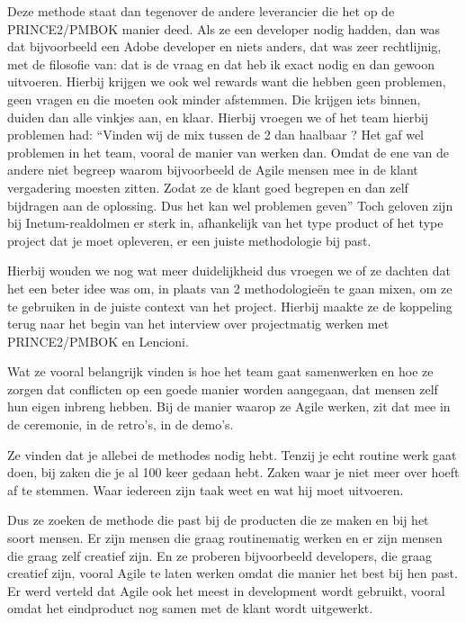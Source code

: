 \documentclass[dutch]{hogent-article}
\begin{document}
Deze methode staat dan tegenover de andere leverancier die het op de PRINCE2/PMBOK manier deed. Als ze een developer nodig hadden, dan was dat bijvoorbeeld een Adobe developer en niets anders, dat was zeer rechtlijnig, met de filosofie van: dat is de vraag en dat heb ik exact nodig en dan gewoon uitvoeren. Hierbij krijgen we ook wel rewards want die hebben geen problemen, geen vragen en die moeten ook minder afstemmen. Die krijgen iets binnen, duiden dan alle vinkjes aan, en klaar. Hierbij vroegen we of het team hierbij problemen had: “Vinden wij de mix tussen de 2 dan haalbaar ? Het gaf wel problemen in het team, vooral de manier van werken dan. Omdat de ene van de andere niet begreep waarom bijvoorbeeld de Agile mensen mee in de klant vergadering moesten zitten. Zodat ze de klant goed begrepen en dan zelf bijdragen aan de oplossing. Dus het kan wel problemen geven” Toch geloven zijn bij Inetum-realdolmen er sterk in, afhankelijk van het type product of het type project dat je moet opleveren, er een juiste methodologie bij past.
\newline

Hierbij wouden we nog wat meer duidelijkheid dus vroegen we of ze dachten dat het een beter idee was om, in plaats van 2 methodologieën te gaan mixen, om ze te gebruiken in de juiste context van het project. Hierbij maakte ze de koppeling terug naar het begin van het interview over projectmatig werken met PRINCE2/PMBOK en Lencioni. 
\newline

Wat ze vooral belangrijk vinden is hoe het team gaat samenwerken en hoe ze zorgen dat conflicten op een goede manier worden aangegaan, dat mensen zelf hun eigen inbreng hebben. Bij de manier waarop ze Agile werken, zit dat mee in de ceremonie, in de retro’s, in de demo’s. 
\newline

Ze vinden dat je allebei de methodes nodig hebt. Tenzij je echt routine werk gaat doen, bij zaken die je al 100 keer gedaan hebt. Zaken waar je niet meer over hoeft af te stemmen. Waar iedereen zijn taak weet en wat hij moet uitvoeren.
\newline

Dus ze zoeken de methode die past bij de producten die ze maken en bij het soort mensen. Er zijn mensen die graag routinematig werken en er zijn mensen die graag zelf creatief zijn. En ze proberen bijvoorbeeld developers, die graag creatief zijn, vooral Agile te laten werken omdat die manier het best bij hen past. Er werd verteld dat Agile ook het meest in development wordt gebruikt, vooral omdat het eindproduct nog samen met de klant wordt uitgewerkt. 
\newline
\end{document}
